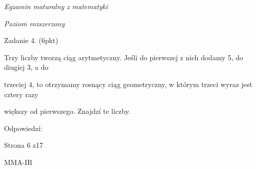 \documentclass[a4paper,12pt]{article}
\begin{document}
{\it Egzamin maturalny z matematyki}

{\it Poziom rozszerzony}

Zadanie 4. (6pkt)

Trzy liczby tworzą ciąg arytmetyczny. Jeśli do pierwszej z nich dodamy 5, do diugiej 3, a do

trzeciej 4, to otrzymamy rosnący ciąg geometryczny, w którym trzeci wyraz jest cztery razy

większy od pierwszego. Znajdzí te liczby.

Odpowiedzí:

Strona 6 z17

MMA-IR
\end{document}
